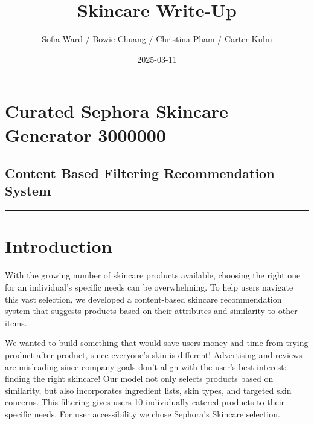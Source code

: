 \documentclass[
]{article}
\title{Skincare Write-Up}
\author{Sofia Ward / Bowie Chuang / Christina Pham / Carter Kulm}
\date{2025-03-11}
\begin{document}
\maketitle

\section{Curated Sephora Skincare Generator
3000000}\label{curated-sephora-skincare-generator-3000000}

\subsection{Content Based Filtering Recommendation
System}\label{content-based-filtering-recommendation-system}

\begin{center}\rule{0.5\linewidth}{0.5pt}\end{center}

\section{Introduction}\label{introduction}

With the growing number of skincare products available, choosing the
right one for an individual's specific needs can be overwhelming. To
help users navigate this vast selection, we developed a content-based
skincare recommendation system that suggests products based on their
attributes and similarity to other items.

We wanted to build something that would save users money and time from
trying product after product, since everyone's skin is different!
Advertising and reviews are misleading since company goals don't align
with the user's best interest: finding the right skincare! Our model not
only selects products based on similarity, but also incorporates
ingredient lists, skin types, and targeted skin concerns. This filtering
gives users 10 individually catered products to their specific needs.
For user accessibility we chose Sephora's Skincare selection.
\end{document}
